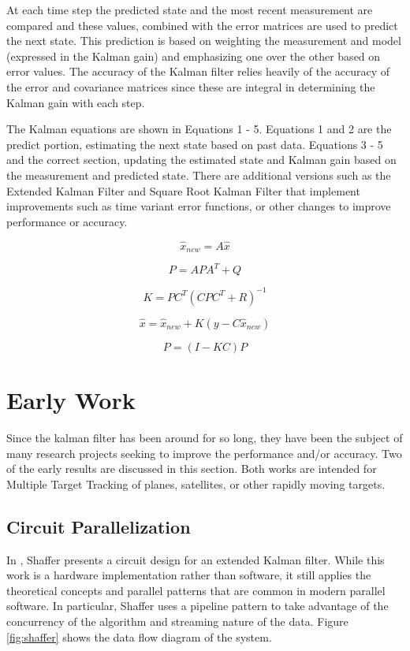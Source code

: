 \documentclass[11pt]{article}
\begin{document}
At each time step the predicted state and the most recent measurement are compared and these values, combined with the error matrices are used to predict the next state. This prediction is based on weighting the measurement and model (expressed in the Kalman gain) and emphasizing one over the other based on error values. The accuracy of the Kalman filter relies heavily of the accuracy of the error and covariance matrices since these are integral in determining the Kalman gain with each step.

The Kalman equations are shown in Equations 1 - 5. Equations 1 and 2 are the predict portion, estimating the next state based on past data. Equations 3 - 5 and the correct section, updating the estimated state and Kalman gain based on the measurement and predicted state. There are additional versions such as the Extended Kalman Filter and Square Root Kalman Filter that implement improvements such as time variant error functions, or other changes to improve performance or accuracy.

\begin{equation}
\hat{x}_{new} = A\hat{x}
\end{equation}

\begin{equation}
P=APA^T+Q
\end{equation}

\begin{equation}
K = PC^T(CPC^T+R)^{-1}
\end{equation}

\begin{equation}
\hat{x}=\hat{x}_{new} + K(y-C\hat{x}_{new})
\end{equation}

\begin{equation}
P=(I-KC)P
\end{equation}

\section{Early Work}
Since the kalman filter has been around for so long, they have been the subject of many research projects seeking to improve the performance and/or accuracy. Two of the early results are discussed in this section. Both works are intended for Multiple Target Tracking of planes, satellites, or other rapidly moving targets.

\subsection{Circuit Parallelization}
In \cite{Shaffer:1987:IPE:42040.42101}, Shaffer presents a circuit design for an extended Kalman filter. While this work is a hardware implementation rather than software, it still applies the theoretical concepts and parallel patterns that are common in modern parallel software. In particular, Shaffer uses a pipeline pattern to take advantage of the concurrency of the algorithm and streaming nature of the data. Figure \ref{fig:shaffer} shows the data flow diagram of the system.
\end{document}
